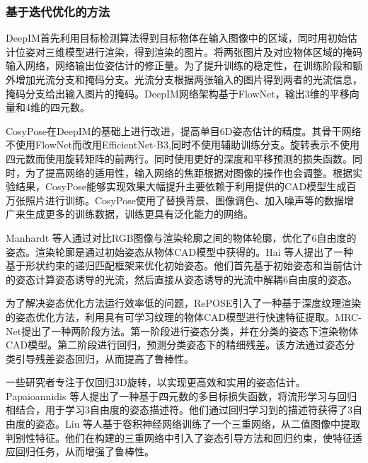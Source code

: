 \subsubsection{基于迭代优化的方法}\label{基于迭代优化的方法}

DeepIM\cite{li2018deepim}首先利用目标检测算法得到目标物体在输入图像中的区域，同时用初始估计位姿对三维模型进行渲染，得到渲染的图片。将两张图片及对应物体区域的掩码输入网络，网络输出位姿估计的修正量。为了提升训练的稳定性，在训练阶段和额外增加光流分支和掩码分支。光流分支根据两张输入的图片得到两者的光流信息，掩码分支给出输入图片的掩码。DeepIM网络架构基于FlowNet\cite{dosovitskiy2015flownet}，输出3维的平移向量和4维的四元数。

\par CosyPose\cite{labbe2020cosypose}在DeepIM\cite{li2018deepim}的基础上进行改进，提高单目6D姿态估计的精度。其骨干网络不使用FlowNet\cite{dosovitskiy2015flownet}而改用EfficientNet-B3\cite{koonce2021efficientnet},同时不使用辅助训练分支。旋转表示不使用四元数而使用旋转矩阵的前两行。同时使用更好的深度和平移预测的损失函数。同时，为了提高网络的适用性，输入网络的焦距根据对图像的操作也会调整。根据实验结果，CosyPose能够实现效果大幅提升主要依赖于利用提供的CAD模型生成百万张照片进行训练。CosyPose使用了替换背景、图像调色、加入噪声等的数据增广来生成更多的训练数据，训练更具有泛化能力的网络。

\par Manhardt 等人\cite{manhardt2018deep}通过对比RGB图像与渲染轮廓之间的物体轮廓，优化了6自由度的姿态。渲染轮廓是通过初始姿态从物体CAD模型中获得的。Hai 等人\cite{hai2023shape}提出了一种基于形状约束的递归匹配框架来优化初始姿态。他们首先基于初始姿态和当前估计的姿态计算姿态诱导的光流，然后直接从姿态诱导的光流中解耦6自由度的姿态。

\par 为了解决姿态优化方法运行效率低的问题，RePOSE\cite{Repose}引入了一种基于深度纹理渲染的姿态优化方法，利用具有可学习纹理的物体CAD模型进行快速特征提取。MRC-Net\cite{li2024mrcnet}提出了一种两阶段方法。第一阶段进行姿态分类，并在分类的姿态下渲染物体CAD模型。第二阶段进行回归，预测分类姿态下的精细残差。该方法通过姿态分类引导残差姿态回归，从而提高了鲁棒性。

一些研究者专注于仅回归3D旋转，以实现更高效和实用的姿态估计。Papaioannidis 等人\cite{papaioannidis20193d}提出了一种基于四元数的多目标损失函数，将流形学习与回归相结合，用于学习3自由度的姿态描述符。他们通过回归学习到的描述符获得了3自由度的姿态。Liu 等人\cite{liu2019regression}基于卷积神经网络训练了一个三重网络，从二值图像中提取判别性特征。他们在构建的三重网络中引入了姿态引导方法和回归约束，使特征适应回归任务，从而增强了鲁棒性。

